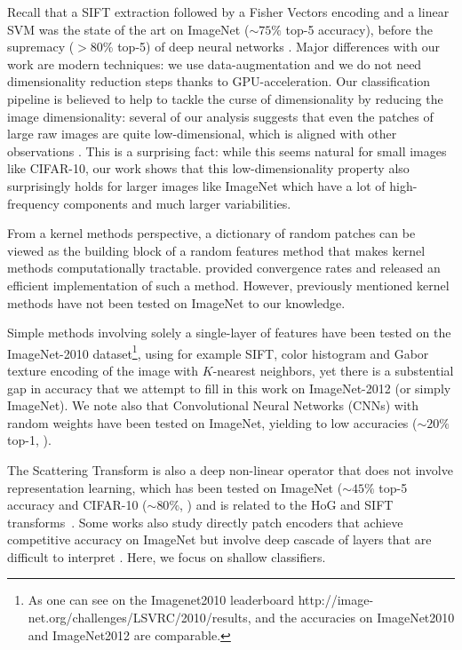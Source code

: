 \documentclass{article}
\begin{document}
Recall that a SIFT extraction \cite{lowe2004distinctive} followed by a Fisher Vectors encoding \citep{sanchez2013image} and a linear SVM was the state of the art on ImageNet ($\sim 75\% $ top-5 accuracy), before the supremacy ($ > 80$\% top-5) of deep neural networks \citet{krizhevsky2012imagenet}.
Major differences with our work are modern techniques: we use data-augmentation and we do not need dimensionality reduction steps thanks to GPU-acceleration.
Our classification pipeline is believed to help to tackle the curse of dimensionality by reducing the image dimensionality: several of our analysis  suggests that even the patches of large raw images are quite low-dimensional, which is aligned with other observations \citep{Oyallon_2017_CVPR}.
This is a surprising fact: while this seems natural for small  images like CIFAR-10, our work shows that this low-dimensionality property also surprisingly holds for larger images like ImageNet which have a lot of high-frequency components and much larger variabilities.

From a kernel methods perspective, a dictionary of random patches can be viewed as the building block of a random features method \citep{rahimi2008random} that makes kernel methods computationally tractable.
\cite{rudi2017falkon} provided convergence rates and released an efficient implementation of such a method.
However, previously mentioned kernel methods \citep{mairal2016end,li2019enhanced,shankar2020neural} have not been tested on ImageNet to our knowledge.

Simple methods involving solely a single-layer of  features  have been tested on the ImageNet-2010 dataset\footnote{ As one can see on the Imagenet2010 leaderboard http://image-net.org/challenges/LSVRC/2010/results, and the accuracies on ImageNet2010 and ImageNet2012 are comparable.}, using for example SIFT, color histogram and Gabor texture encoding of the image with $K$-nearest neighbors, yet there is a substential gap in accuracy that we attempt to fill in this work on ImageNet-2012 (or simply ImageNet). We note also that Convolutional Neural Networks (CNNs) with random weights have been tested on ImageNet, yielding to low accuracies ($\sim 20\%$ top-1, \citep{arandjelovic2017look}).

The Scattering Transform \citep{mallat2012group} is also a deep non-linear operator that does not involve representation learning, which has been tested on ImageNet ($\sim 45\%$ top-5 accuracy \citep{zarka2019deep} and  CIFAR-10 ($\sim 80 \%$, \citep{Oyallon_2015_CVPR}) and is related to the HoG and SIFT transforms~\citep{Oyallon_2018_ECCV}.
Some works also study directly patch encoders that achieve competitive accuracy on ImageNet but involve deep cascade of layers that are difficult to interpret \citep{oyallon2017scaling,zarka2019deep,brendel2019approximating}. Here, we focus on shallow classifiers.
\end{document}
